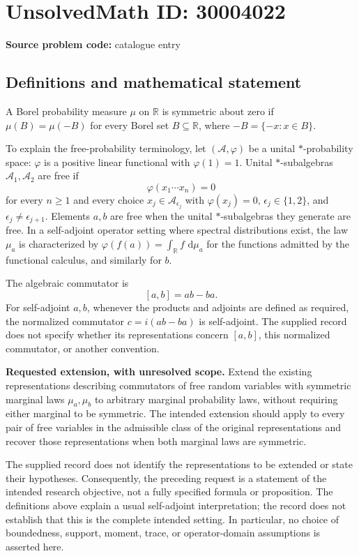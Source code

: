 \documentclass[11pt]{article}
\newcommand{\R}{\mathbb{R}}
\newcommand{\dd}{\,\mathrm{d}}
\begin{document}
\section*{UnsolvedMath ID: 30004022}
\textbf{Source problem code:} catalogue entry
\subsection{Definitions and mathematical statement}
A Borel probability measure \(\mu\) on \(\R\) is symmetric about zero if \(\mu(B)=\mu(-B)\) for every Borel set \(B\subseteq\R\), where \(-B=\{-x:x\in B\}\).

To explain the free-probability terminology, let \((\mathcal A,\varphi)\) be a unital \(*\)-probability space: \(\varphi\) is a positive linear functional with \(\varphi(1)=1\). Unital \(*\)-subalgebras \(\mathcal A_1,\mathcal A_2\) are free if
\[
\varphi(x_1\cdots x_n)=0
\]
for every \(n\geq1\) and every choice \(x_j\in\mathcal A_{\epsilon_j}\) with \(\varphi(x_j)=0\), \(\epsilon_j\in\{1,2\}\), and \(\epsilon_j\neq\epsilon_{j+1}\). Elements \(a,b\) are free when the unital \(*\)-subalgebras they generate are free. In a self-adjoint operator setting where spectral distributions exist, the law \(\mu_a\) is characterized by \(\varphi(f(a))=\int_{\R}f\,\dd\mu_a\) for the functions admitted by the functional calculus, and similarly for \(b\).

The algebraic commutator is
\[
[a,b]=ab-ba.
\]
For self-adjoint \(a,b\), whenever the products and adjoints are defined as required, the normalized commutator \(c=i(ab-ba)\) is self-adjoint. The supplied record does not specify whether its representations concern \([a,b]\), this normalized commutator, or another convention.

\textbf{Requested extension, with unresolved scope.} Extend the existing representations describing commutators of free random variables with symmetric marginal laws \(\mu_a,\mu_b\) to arbitrary marginal probability laws, without requiring either marginal to be symmetric. The intended extension should apply to every pair of free variables in the admissible class of the original representations and recover those representations when both marginal laws are symmetric.

The supplied record does not identify the representations to be extended or state their hypotheses. Consequently, the preceding request is a statement of the intended research objective, not a fully specified formula or proposition. The definitions above explain a usual self-adjoint interpretation; the record does not establish that this is the complete intended setting. In particular, no choice of boundedness, support, moment, trace, or operator-domain assumptions is asserted here.
\end{document}
